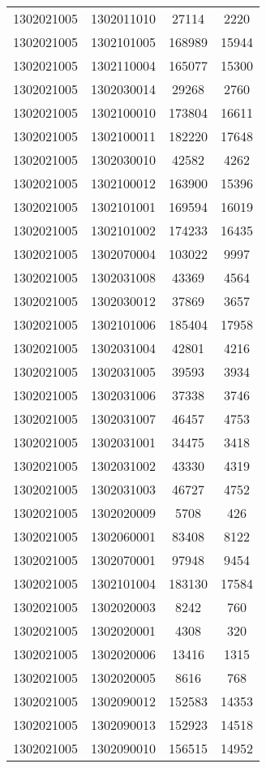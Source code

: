 \begin{longtable}[h]{llcc}
		1302021005 & 1302011010 & 27114 & 2220\\
		1302021005 & 1302101005 & 168989 & 15944\\
		1302021005 & 1302110004 & 165077 & 15300\\
		1302021005 & 1302030014 & 29268 & 2760\\
		1302021005 & 1302100010 & 173804 & 16611\\
		1302021005 & 1302100011 & 182220 & 17648\\
		1302021005 & 1302030010 & 42582 & 4262\\
		1302021005 & 1302100012 & 163900 & 15396\\
		1302021005 & 1302101001 & 169594 & 16019\\
		1302021005 & 1302101002 & 174233 & 16435\\
		1302021005 & 1302070004 & 103022 & 9997\\
		1302021005 & 1302031008 & 43369 & 4564\\
		1302021005 & 1302030012 & 37869 & 3657\\
		1302021005 & 1302101006 & 185404 & 17958\\
		1302021005 & 1302031004 & 42801 & 4216\\
		1302021005 & 1302031005 & 39593 & 3934\\
		1302021005 & 1302031006 & 37338 & 3746\\
		1302021005 & 1302031007 & 46457 & 4753\\
		1302021005 & 1302031001 & 34475 & 3418\\
		1302021005 & 1302031002 & 43330 & 4319\\
		1302021005 & 1302031003 & 46727 & 4752\\
		1302021005 & 1302020009 & 5708 & 426\\
		1302021005 & 1302060001 & 83408 & 8122\\
		1302021005 & 1302070001 & 97948 & 9454\\
		1302021005 & 1302101004 & 183130 & 17584\\
		1302021005 & 1302020003 & 8242 & 760\\
		1302021005 & 1302020001 & 4308 & 320\\
		1302021005 & 1302020006 & 13416 & 1315\\
		1302021005 & 1302020005 & 8616 & 768\\
		1302021005 & 1302090012 & 152583 & 14353\\
		1302021005 & 1302090013 & 152923 & 14518\\
		1302021005 & 1302090010 & 156515 & 14952\\

\end{longtable}
